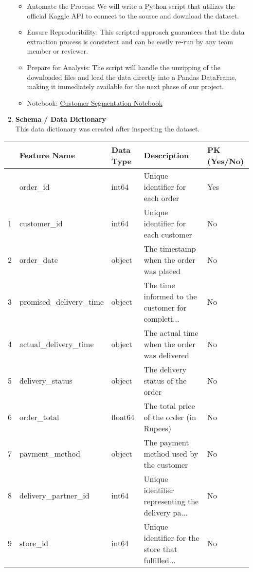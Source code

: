 \documentclass[
  letterpaper,
  DIV=11,
  numbers=noendperiod]{scrartcl}
\providecommand{\tightlist}{%
  \setlength{\itemsep}{0pt}\setlength{\parskip}{0pt}}
\begin{document}
\begin{enumerate}
  \begin{itemize}
  \tightlist
  \item
    Automate the Process: We will write a Python script that utilizes
    the official Kaggle API to connect to the source and download the
    dataset.\\
  \item
    Ensure Reproducibility: This scripted approach guarantees that the
    data extraction process is consistent and can be easily re-run by
    any team member or reviewer.\\
  \item
    Prepare for Analysis: The script will handle the unzipping of the
    downloaded files and load the data directly into a Pandas DataFrame,
    making it immediately available for the next phase of our project.\\
  \item
    Notebook: \href{notebook/customer_segmentation_model.ipynb}{Customer
    Segmentation Notebook}
  \end{itemize}
\item
  \textbf{Schema / Data Dictionary}\\
  This data dictionary was created after inspecting the dataset.
\end{enumerate}

\begin{longtable}[]{@{}lllll@{}}
\toprule\noalign{}
& Feature Name & Data Type & Description & PK (Yes/No) \\
\midrule\noalign{}
\endhead
\bottomrule\noalign{}
\endlastfoot
0 & order\_id & int64 & Unique identifier for each order & Yes \\
1 & customer\_id & int64 & Unique identifier for each customer & No \\
2 & order\_date & object & The timestamp when the order was placed &
No \\
3 & promised\_delivery\_time & object & The time informed to the
customer for completi... & No \\
4 & actual\_delivery\_time & object & The actual time when the order was
delivered & No \\
5 & delivery\_status & object & The delivery status of the order & No \\
6 & order\_total & float64 & The total price of the order (in Rupees) &
No \\
7 & payment\_method & object & The payment method used by the customer &
No \\
8 & delivery\_partner\_id & int64 & Unique identifier representing the
delivery pa... & No \\
9 & store\_id & int64 & Unique identifier for the store that
fulfilled... & No \\
\end{longtable}
\end{document}
